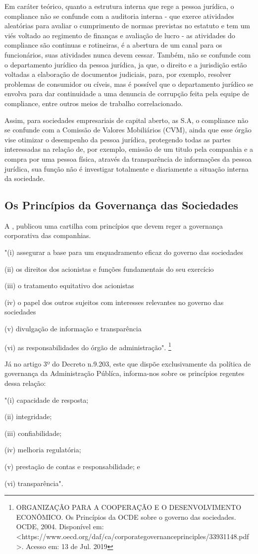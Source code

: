 Em caráter teórico, quanto a estrutura interna que rege a pessoa jurídica, o compliance não se confunde com a auditoria interna - que exerce atividades aleatórias para avaliar o cumprimento de normas previstas no estatuto e tem um viés voltado ao regimento de finanças e avaliação de lucro - as atividades do compliance são continuas e rotineiras, é a abertura de um canal para os funcionários, suas atividades nunca devem cessar. Também, não se confunde com o departamento jurídico da pessoa jurídica, ja que, o direito e a jurisdição estão voltadas a elaboração de documentos judiciais, para, por exemplo, resolver problemas de consumidor ou cíveis, mas é possível que o departamento jurídico se envolva para dar continuidade a uma denuncia de corrupção feita pela equipe de compliance, entre outros meios de trabalho correlacionado. 

Assim, para sociedades empresariais de capital aberto, as S.A, o compliance não se confunde com a Comissão de Valores Mobiliários (CVM), ainda que esse órgão vise otimizar o desempenho da pessoa jurídica, protegendo todas as partes interessadas na relação de, por exemplo, emissão de um titulo pela companhia e a compra por uma pessoa física, através da transparência de informações da pessoa jurídica, sua função não é investigar totalmente e diariamente a situação interna da sociedade. 

\subsection*{Os Princípios da Governança das Sociedades}

A \cite{ocdeprincipios}, publicou uma cartilha com princípios que devem reger a governança corporativa das companhias. 

"(i) assegurar a base para um enquadramento eficaz do governo das sociedades 

(ii) os direitos dos acionistas e funções fundamentais do seu exercício

(iii) o tratamento equitativo dos acionistas

(iv) o papel dos outros sujeitos com interesses relevantes no governo
das sociedades

(v) divulgação de informação e transparência

(vi) as responsabilidades do órgão de administração". \footnote{ORGANIZAÇÃO PARA A COOPERAÇÃO E O DESENVOLVIMENTO ECONÔMICO. Os Princípios da OCDE sobre o governo das sociedades. OCDE, 2004. Disponível em: <https://www.oecd.org/daf/ca/corporategovernanceprinciples/33931148.pdf>. Acesso em: 13 de Jul. 2019}

Já no artigo 3º do Decreto n.9.203, este que dispõe exclusivamente da política de governança da Administração Públíca, informa-nos sobre os princípios regentes dessa relação: 

"(i) capacidade de resposta;

(ii) integridade;

(iii) confiabilidade;

(iv) melhoria regulatória;

(v) prestação de contas e responsabilidade; e

(vi) transparência".